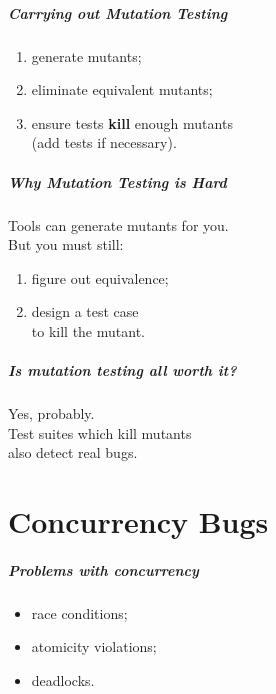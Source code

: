 \documentclass{beamer}
\newenvironment{changemargin}[1]{%
  \begin{list}{}{%
    \setlength{\topsep}{0pt}%
    \setlength{\leftmargin}{#1}%
    \setlength{\rightmargin}{1em}
    \setlength{\listparindent}{\parindent}%
    \setlength{\itemindent}{\parindent}%
    \setlength{\parsep}{\parskip}%
  }%
  \item[]}{\end{list}}
\begin{document}
\begin{frame}
  \frametitle{Carrying out Mutation Testing}
  \begin{changemargin}{2cm}
    \Large
    \begin{enumerate}
    \item generate mutants;
    \item eliminate equivalent mutants;
    \item ensure tests {\bf kill} enough mutants \\
      (add tests if necessary).
    \end{enumerate}
  \end{changemargin}
\end{frame}

\begin{frame}
  \frametitle{Why Mutation Testing is Hard}
  \begin{changemargin}{2cm}
    \Large
    Tools can generate mutants for you.\\[1em]
    But you must still:
    \begin{enumerate}
  \item figure out equivalence;
  \item design a test case \\
    \hspace*{2em} to kill the mutant.
    \end{enumerate}
  \end{changemargin}
\end{frame}

\begin{frame}
  \frametitle{Is mutation testing all worth it?}

  \begin{changemargin}{2cm}
    \Large
    Yes, probably.\\[1em]
    Test suites which kill mutants\\
    also detect real bugs.
  \end{changemargin}
\end{frame}

\part{Concurrency Bugs}
\begin{frame}
\partpage
\end{frame}

\begin{frame}
  \frametitle{Problems with concurrency}

  \begin{changemargin}{2cm}
    \Large
    \begin{itemize}
  \item race conditions;
  \item atomicity violations;
  \item deadlocks.
    \end{itemize}
  \end{changemargin}
\end{frame}
\end{document}
